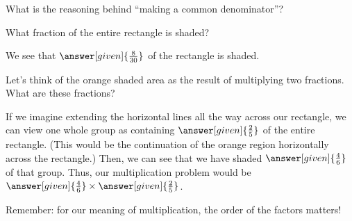 \documentclass[nooutcomes]{ximera}
\begin{document}
\begin{problem}
What is the reasoning behind ``making a common denominator''?
\begin{multipleChoice}
\end{multipleChoice}
\end{problem}







\begin{problem}
What fraction of the entire rectangle is shaded?

\begin{center} \end{center}

\begin{prompt}
We see that $\answer[given]{\frac{8}{30}}$ of the rectangle is shaded.
\end{prompt}

\begin{problem}
	Let's think of the orange shaded area as the result of multiplying two fractions. What are these fractions?
	
	\begin{prompt}
	If we imagine extending the horizontal lines all the way across our rectangle, we can view one whole group as containing $\answer[given]{\frac{2}{5}}$ of the entire rectangle.  (This would be the continuation of the orange region horizontally across the rectangle.) Then, we can see that we have shaded $\answer[given]{\frac{4}{6}}$ of that group.  Thus, our multiplication problem would be $\answer[given]{\frac{4}{6}} \times \answer[given]{\frac{2}{5}}$.
	
	\begin{hint}
	Remember: for our meaning of multiplication, the order of the factors matters!
	\end{hint}
	\end{prompt}
\end{problem}

\end{problem}
\end{document}
